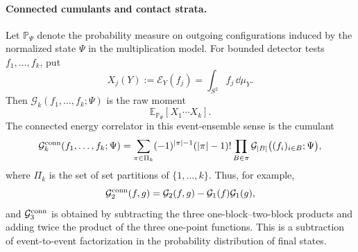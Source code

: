 \paragraph{Connected cumulants and contact strata.}
Let \(\mathbb P_\Psi\) denote the probability measure on outgoing
configurations induced by the normalized state \(\Psi\) in the multiplication
model.  For bounded detector tests \(f_1,\ldots,f_k\), put
\[
  X_j(Y):=\mathcal E_Y(f_j)
  =
  \int_{S^2} f_j\,\dd\mu_Y .
\]
Then \(\mathcal G_k(f_1,\ldots,f_k;\Psi)\) is the raw moment
\[
  \mathbb E_{\mathbb P_\Psi}\!\left[X_1\cdots X_k\right].
\]
The connected energy correlator in this event-ensemble sense is the cumulant
\begin{equation}
  \mathcal G_k^{\rm conn}(f_1,\ldots,f_k;\Psi)
  =
  \sum_{\pi\in\Pi_k}
  (-1)^{|\pi|-1}(|\pi|-1)!
  \prod_{B\in\pi}
  \mathcal G_{|B|}\bigl((f_i)_{i\in B};\Psi\bigr),
  \label{eq:qcd-energy-correlator-cumulant}
\end{equation}
where \(\Pi_k\) is the set of set partitions of
\(\{1,\ldots,k\}\).  Thus, for example,
\[
  \mathcal G_2^{\rm conn}(f,g)
  =
  \mathcal G_2(f,g)-\mathcal G_1(f)\mathcal G_1(g),
\]
and \(\mathcal G_3^{\rm conn}\) is obtained by subtracting the three
one-block--two-block products and adding twice the product of the three
one-point functions.  This is a subtraction of event-to-event factorization
in the probability distribution of final states.

